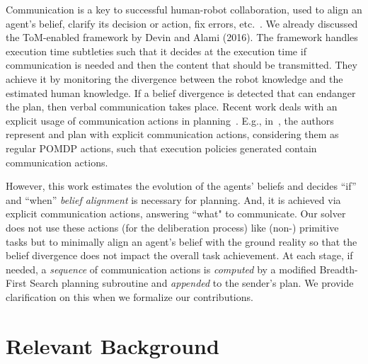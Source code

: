 \documentclass[letterpaper]{article} %
\begin{document}
Communication is a key to successful human-robot collaboration, used to align an agent's belief, clarify its decision or action, fix errors, etc.~\cite{tellex2014asking,sebastiani2017dealing}. We already discussed the ToM-enabled framework by Devin and Alami (2016). The framework handles execution time subtleties such that it decides at the execution time if communication is needed and then the content that should be transmitted. 
They achieve it by monitoring the divergence between the robot knowledge and the estimated human knowledge. If a belief divergence is detected that can endanger the plan, then verbal communication takes place. 
Recent work deals with an explicit usage of communication actions in planning~\cite{BuisanSA20,nikolaidis2018planning,roncone2017transparent,sanelli2017short,UnhelkarLS20}. 
E.g., in~\cite{roncone2017transparent,UnhelkarLS20}, the authors represent and plan with explicit communication actions, considering them as regular POMDP actions, such that execution policies generated contain communication actions.

However, this work estimates the evolution of the agents' beliefs and decides ``if'' and ``when'' \textit{belief alignment} is necessary for planning. 
And, it is achieved via explicit communication actions, answering ``what" to communicate. 
Our solver does not use these actions (for the deliberation process) like (non-) primitive tasks but to minimally align an agent's belief with the ground reality so that the belief divergence does not impact the overall task achievement. 
At each stage, if needed, a \textit{sequence} of communication actions is \textit{computed} by a modified Breadth-First Search planning subroutine and \textit{appended} to the sender's plan. We provide clarification on this when we formalize our contributions. 


\section{Relevant Background}


\end{document}
